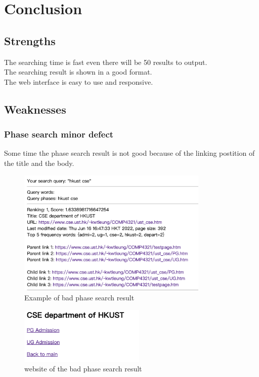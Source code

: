 \documentclass{article}
\begin{document}
    \section*{Conclusion}
        \subsection*{Strengths}
        The searching time is fast even there will be 50 results to output. \\
        The searching result is shown in a good format. \\
        The web interface is easy to use and responsive. 
        \subsection*{Weaknesses}
        \subsubsection*{Phase search minor defect}
        Some time the phase search result is not good because of the linking postition of the title and the body.
        \begin{figure}[!htbp]
            \centering
            \includegraphics[height=6cm]{bad2.png}
            \caption{Example of bad phase search result}
        \end{figure}

        \begin{figure}[!htbp]
            \centering
            \includegraphics[width=6cm]{bad3.png}
            \caption{website of the bad phase search result}
        \end{figure}
\end{document}
